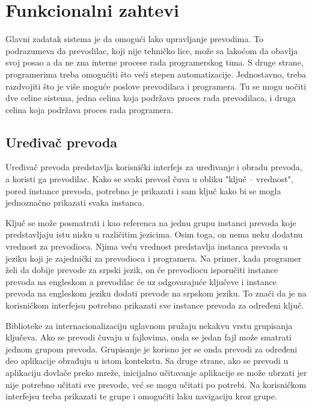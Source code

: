 \chapter{Funkcionalni zahtevi}\label{ch:funkcionalni_zahtevi}

Glavni zadatak sistema je da omogući lako upravljanje prevodima. To podrazumeva da prevodilac, koji nije tehničko 
lice, može sa lakoćom da obavlja svoj posao a da ne zna interne procese rada programerskog tima. S druge
strane, programerima treba omogućiti što veći stepen automatizacije. Jednostavno, treba razdvojiti što je
više moguće poslove prevodilaca i programera. Tu se mogu uočiti dve celine sistema, jedna celina koja podržava
proces rada prevodilaca, i druga celina koja podržava proces rada programera.


\section{Uređivač prevoda}\label{sec:funkcionalni_zahtevi-uredjivac_prevoda}

Uređivač prevoda predstavlja korisnički interfejs za uređivanje i obradu prevoda, a koristi ga prevodilac.
Kako se svaki prevod čuva u obliku "ključ -- vrednost", pored instance prevoda, potrebno je prikazati i sam 
ključ kako bi se mogla jednoznačno prikazati svaka instanca.

Ključ se može posmatrati i kao referenca na jednu grupu instanci prevoda koje predstavljaju istu nisku u različitim 
jezicima. Osim toga, on nema neku dodatnu vrednost za prevodioca.
Njima veću vrednost predstavlja instanca prevoda u jeziku koji je zajednički za prevodioca i programera. Na primer, kada 
programer želi da dobije prevode za srpski jezik, on će prevodiocu isporučiti instance prevoda na engleskom a prevodilac 
će uz odgovarajuće ključeve i instance prevoda na engleskom jeziku dodati prevode na srpskom jeziku. To znači da je na 
korisničkom interfejsu potrebno prikazati sve instance prevoda za određeni ključ.

Biblioteke za internacionalizaciju uglavnom pružaju nekakvu vrstu grupisanja ključeva. Ako se prevodi čuvaju u 
fajlovima, onda se jedan fajl može smatrati jednom grupom prevoda. Grupisanje je korisno jer se onda prevodi 
za određeni deo aplikacije obrađuju u istom kontekstu. Sa druge strane, ako se prevodi u aplikaciju dovlače 
preko mreže, inicijalno učitavanje aplikacije se može ubrzati jer nije potrebno učitati sve prevode, već se 
mogu učitati po potrebi. Na korisničkom interfejsu treba prikazati te grupe i omogućiti laku navigaciju kroz
grupe.

